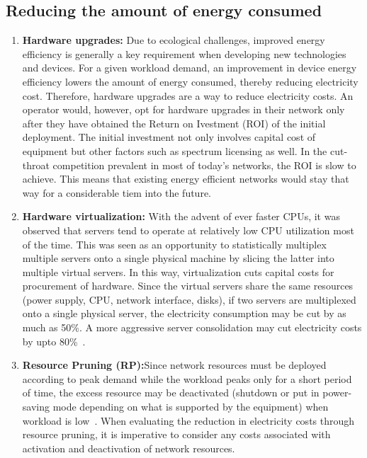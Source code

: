 \subsection{Reducing the amount of energy consumed}
\begin{enumerate}
\item \textbf{Hardware upgrades:} Due to ecological challenges, improved energy efficiency is generally a key requirement when developing new technologies and devices. For a given workload demand, an improvement in device energy efficiency lowers the amount of energy consumed, thereby reducing electricity cost. Therefore, hardware upgrades are a way to reduce electricity costs. An operator would, however, opt for hardware upgrades in their network only after they have obtained the Return on Ivestment (ROI) of the initial deployment. The initial investment not only involves capital cost of equipment but other factors such as spectrum licensing as well. In the cut-throat competition prevalent in most of today's networks, the ROI is slow to achieve. This means that existing energy efficient networks would stay that way for a considerable tiem into the future.
\item \textbf{Hardware virtualization:} With the advent of ever faster CPUs, it was observed that servers tend to operate at relatively low CPU utilization most of the time. This was seen as an opportunity to statistically multiplex multiple servers onto a single physical machine by slicing the latter into multiple virtual servers. In this way, virtualization cuts capital costs for procurement of hardware. Since the virtual servers share the same resources (power supply, CPU, network interface, disks), if two servers are multiplexed onto a single physical server, the electricity consumption may be cut by as much as 50\%. A more aggressive server consolidation may cut electricity costs by upto 80\%~\cite{VirtualizationCutsPower}.
\item \textbf{Resource Pruning (RP):}Since network resources must be deployed according to peak demand while the workload peaks only for a short period of time, the excess resource may be deactivated (shutdown or put in power-saving mode depending on what is supported by the equipment) when workload is low~\cite{Chase:2001:MES:502059.502045,Chen:2008:ESP:1387589.1387613,Meisner:2009:PES:1508244.1508269,Lin_dynamicright-sizing,Peng:2011:TPS:2030613.2030628}. When evaluating the reduction in electricity costs through resource pruning, it is imperative to consider any costs associated with activation and deactivation of network resources.
\end{enumerate}

